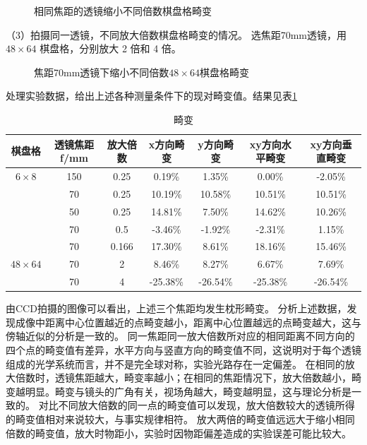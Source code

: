 \documentclass[10pt,a4paper,twoside,UTF8]{ctexart}
\begin{document}
\begin{figure}[H]
	\centering
	\caption{相同焦距的透镜缩小不同倍数棋盘格畸变}
	\label{fig:dif_t}
\end{figure}

（3）拍摄同一透镜，不同放大倍数棋盘格畸变的情况。
选焦距70mm透镜，用 $48\times 64$ 棋盘格，分别放大 2 倍和 4 倍。
\begin{figure}[H]
	\centering
	\caption{焦距70mm透镜下缩小不同倍数$48\times64$棋盘格畸变}
	\label{fig:dif_t}
\end{figure}

处理实验数据，给出上述各种测量条件下的现对畸变值。结果见表\ref{tab:distortion}
\begin{table}[H]
	\centering
	  \begin{tabular}{ccccccc}
	  \toprule
	  棋盘格&透镜焦距f/mm & 放大倍数 &x方向畸变 & y方向畸变 & xy方向水平畸变 & xy方向垂直畸变  \\
	  \midrule
	  $6\times 8 $ & 150   & 0.25 &0.19\% & 1.35\% & 0.00\% & -2.05\% \\
	  & 70    & 0.25&10.19\% & 10.58\% & 10.51\% & 10.51\% \\
	  & 50    & 0.25 &14.81\% & 7.50\% & 14.62\% & 10.26\% \\
	  & 70    & 0.5  &-3.46\% & -1.92\% & -2.31\% & 1.15\% \\
	  & 70    & 0.166&17.30\% & 8.61\% & 18.16\% & 15.46\% \\
	  \midrule
	  $48\times 64 $ & 70    & 2 &8.46\% & 8.27\% & 6.67\% & 7.69\% \\
	  & 70    & 4  &-25.38\% & -26.54\% & -25.38\% & -26.54\% \\
	  \bottomrule
	  \end{tabular}
	\caption{畸变}
	\label{tab:distortion}
  \end{table}
  
由CCD拍摄的图像可以看出，上述三个焦距均发生枕形畸变。
分析上述数据，发现成像中距离中心位置越近的点畸变越小，距离中心位置越远的点畸变越大，这与傍轴近似的分析是一致的。
同一焦距同一放大倍数所对应的相同距离不同方向的四个点的畸变值有差异，水平方向与竖直方向的畸变值不同，这说明对于每个透镜组成的光学系统而言，并不是完全球对称，实验光路存在一定偏差。
在相同的放大倍数时，透镜焦距越大，畸变率越小；在相同的焦距情况下，放大倍数越小，畸变越明显。畸变与镜头的广角有关，视场角越大，畸变越明显，这与理论分析是一致的。
对比不同放大倍数的同一点的畸变值可以发现，放大倍数较大的透镜所得的畸变值相对来说较大，与事实规律相符。
放大两倍的畸变值远远大于缩小相同倍数的畸变值，放大时物距小，实验时因物距偏差造成的实验误差可能比较大。
\end{document}
